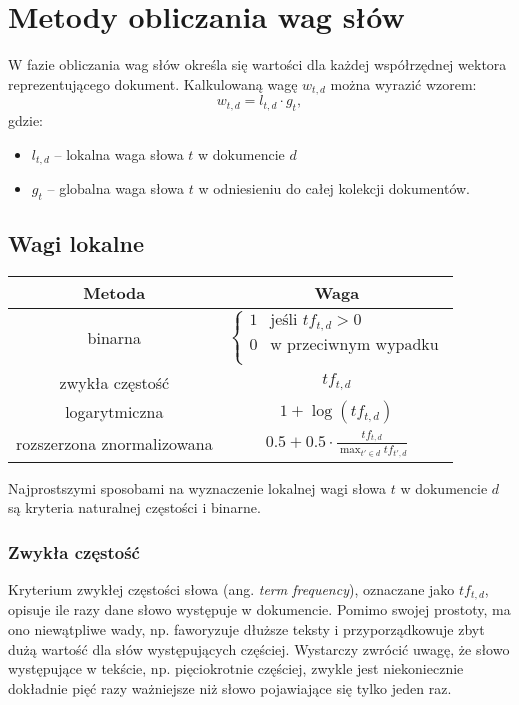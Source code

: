 \documentclass{pracamgr}
\begin{document}
\section{Metody obliczania wag słów}

W fazie obliczania wag słów określa się wartości dla każdej współrzędnej wektora reprezentującego dokument. Kalkulowaną wagę $w_{t,d}$ można wyrazić wzorem:
\[
w_{t,d} = l_{t,d} \cdot g_{t},
\]
gdzie:
\begin{itemize}
    \item $l_{t,d}$ – lokalna waga słowa $t$ w dokumencie $d$
    \item $g_{t}$ – globalna waga słowa $t$ w odniesieniu do całej kolekcji dokumentów.
\end{itemize}

\subsection{Wagi lokalne}
\vspace{3mm}

\begin{tabular}{|c|c|}
     Metoda & Waga \\ \hline
     binarna & $ \begin{cases} 1 & \text{jeśli } tf_{t,d} > 0 \\ 0 & \text{w przeciwnym wypadku} \\ \end{cases} $ \\[0.25cm] 
     zwykła częstość & $ tf_{t,d} $ \\[0.25cm] 
     logarytmiczna & $ 1 + \log(tf_{t,d}) $ \\[0.25cm] 
     rozszerzona znormalizowana & $ 0.5 + 0.5 \cdot \displaystyle\frac{tf_{t,d}}{\displaystyle\max_{t' \in d} tf_{t',d}} $ \\
\end{tabular}
\vspace{5mm}

Najprostszymi sposobami na wyznaczenie lokalnej wagi słowa $t$ w dokumencie $d$ są kryteria naturalnej częstości i binarne.

\subsubsection*{Zwykła częstość}

Kryterium zwykłej częstości słowa (ang. \textit{term frequency}), oznaczane jako $tf_{t,d}$, opisuje ile razy dane słowo występuje w dokumencie. Pomimo swojej prostoty, ma ono niewątpliwe wady, np. faworyzuje dłuższe teksty i przyporządkowuje zbyt dużą wartość dla słów występujących częściej. Wystarczy zwrócić uwagę, że słowo występujące w tekście, np. pięciokrotnie częściej, zwykle jest niekoniecznie dokładnie pięć razy ważniejsze niż słowo pojawiające się tylko jeden raz.
\end{document}
